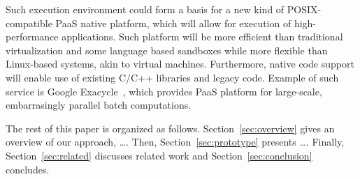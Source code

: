 Such execution environment could form a basis for a new kind of
POSIX-compatible PaaS native platform, which will allow for execution of
high-performance applications. Such platform will be more efficient than
traditional virtualization and some language based sandboxes while more
flexible than Linux-based systems, akin to virtual machines.
Furthermore, native code support will enable use of existing C/C++
libraries and legacy code.  Example of such service is Google
Exacycle~\cite{exacycle:google}, which provides PaaS platform for
large-scale, embarrasingly parallel batch computations.




The rest of this paper is organized as follows.
Section~\ref{sec:overview} gives an overview of our approach, \ldots.
Then, Section~\ref{sec:prototype} presents \ldots. Finally,
Section~\ref{sec:related} discusses related work and
Section~\ref{sec:conclusion} concludes.



